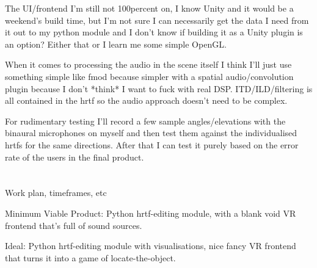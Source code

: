 \documentclass[10pt, oneside, a4paper, draft]{scrartcl}
\begin{document}
The UI/frontend I'm still not 100percent on, I know Unity and it would be a weekend's build time, but I'm not sure I can necessarily get the data I need from it out to my python module and I don't know if building it as a Unity plugin is an option? Either that or I learn me some simple OpenGL. 

When it comes to processing the audio in the scene itself I think I'll just use something simple like fmod because simpler with a spatial audio/convolution plugin because I don't *think* I want to fuck with real DSP. ITD/ILD/filtering is all contained in the hrtf so the audio approach doesn't need to be complex. 

For rudimentary testing I'll record a few sample angles/elevations with the binaural microphones on myself and then test them against the individualised hrtfs for the same directions. After that I can test it purely based on the error rate of the users in the final product. 

\section*{}
Work plan, timeframes, etc

Minimum Viable Product: 
Python hrtf-editing module, with a blank void VR frontend that's full of sound sources. 

Ideal:
Python hrtf-editing module with visualisations, nice fancy VR frontend that turns it into a game of locate-the-object.
\end{document}
